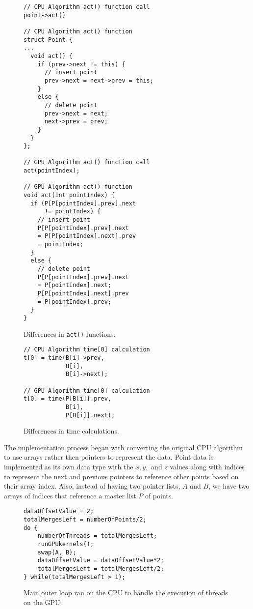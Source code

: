 \documentclass{article}
\begin{document}
\begin{figure}
\begin{lstlisting}
// CPU Algorithm act() function call
point->act()

// CPU Algorithm act() function
struct Point {
...
  void act() {  
    if (prev->next != this) {
      // insert point 
      prev->next = next->prev = this;
    }
    else { 
      // delete point
      prev->next = next; 
      next->prev = prev; 
    }
  }
};

// GPU Algorithm act() function call
act(pointIndex);

// GPU Algorithm act() function
void act(int pointIndex) {
  if (P[P[pointIndex].prev].next 
      != pointIndex) {   
    // insert point
    P[P[pointIndex].prev].next 
    = P[P[pointIndex].next].prev 
    = pointIndex;
  }
  else { 
    // delete point
    P[P[pointIndex].prev].next 
    = P[pointIndex].next;
    P[P[pointIndex].next].prev 
    = P[pointIndex].prev;
  }	
}	
\end{lstlisting}	
\caption{Differences in \texttt{act()} functions.}
\label{act_functions}
\end{figure}

\begin{figure}
\begin{lstlisting}
// CPU Algorithm time[0] calculation
t[0] = time(B[i]->prev, 
            B[i], 
            B[i]->next);

// GPU Algorithm time[0] calculation
t[0] = time(P[B[i]].prev, 
            B[i], 
            P[B[i]].next);
\end{lstlisting}
\caption{Differences in time calculations.}
\label{time_calculations}
\end{figure}

The implementation process began with converting the original CPU algorithm to use arrays rather then pointers to represent the data. Point data is implemented as its own data type with the $x, y,$ and $z$ values along with indices to represent the next and previous pointers to reference other points based on their array index. Also, instead of having two pointer lists, $A$ and $B$, we have two arrays of indices that reference a master list $P$ of points. 

\begin{figure}
\begin{lstlisting}
dataOffsetValue = 2;
totalMergesLeft = numberOfPoints/2;
do {
    numberOfThreads = totalMergesLeft;
    runGPUkernels();
    swap(A, B);
    dataOffsetValue = dataOffsetValue*2;
    totalMergesLeft = totalMergesLeft/2;
} while(totalMergesLeft > 1);
\end{lstlisting}
\caption{Main outer loop ran on the CPU to handle the execution of threads on the GPU.}
\label{main_loop_figure}
\end{figure}
\end{document}
